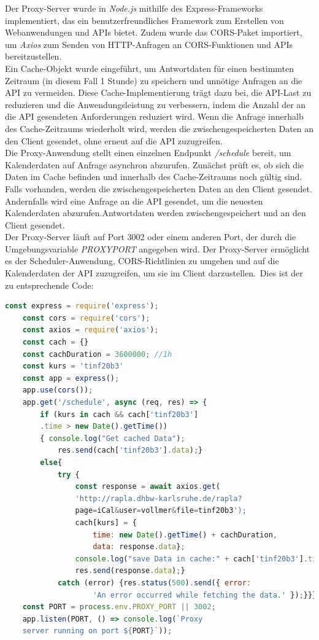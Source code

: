Der Proxy-Server wurde in \emph{Node.js} mithilfe des Express-Frameworks implementiert, das ein benutzerfreundliches Framework zum Erstellen von Webanwendungen und APIs bietet. Zudem wurde das CORS-Paket importiert, um \emph{Axios} zum Senden von HTTP-Anfragen an CORS-Funktionen und APIs bereitzustellen.\\
Ein Cache-Objekt wurde eingeführt, um  Antwortdaten für einen bestimmten Zeitraum (in diesem Fall 1 Stunde) zu speichern und unnötige Anfragen an die API zu vermeiden. Diese Cache-Implementierung trägt dazu bei, die API-Last zu reduzieren und die Anwendungsleistung zu verbessern, indem  die Anzahl der an die API gesendeten Anforderungen reduziert wird. Wenn die Anfrage innerhalb des Cache-Zeitraums wiederholt wird, werden die zwischengespeicherten Daten an den Client gesendet, ohne erneut auf die API zuzugreifen.\\
Die Proxy-Anwendung stellt einen einzelnen Endpunkt \emph{/schedule} bereit, um Kalenderdaten auf Anfrage asynchron abzurufen. Zunächst prüft es, ob sich die Daten im Cache befinden und innerhalb des Cache-Zeitraums noch  gültig sind. Falls vorhanden, werden die zwischengespeicherten Daten an den Client gesendet. Andernfalls wird eine Anfrage an die API gesendet, um die neuesten Kalenderdaten abzurufen.Antwortdaten werden zwischengespeichert und an den Client gesendet.\\
Der Proxy-Server läuft auf Port 3002 oder einem anderen Port, der durch die Umgebungsvariable \emph{PROXYPORT} angegeben wird. Der Proxy-Server ermöglicht es der Scheduler-Anwendung, CORS-Richtlinien zu umgehen und auf die Kalenderdaten der API zuzugreifen, um sie im Client darzustellen.\
Dies ist der zu entsprechende Code:
\begin{lstlisting}[language=JavaScript,
	frame=single,           % Ein Rahmen um den Code
	framexleftmargin=15pt,  % Rahmen link von den Zahlen
	style=algoBericht,
	label={Proxy-Server},
	captionpos=b ,          % Caption unter den Code setzen
	caption={Proxy-Server}]
	const express = require('express');
	const cors = require('cors');
	const axios = require('axios');
	const cach = {}
	const cachDuration = 3600000; //1h
	const kurs = 'tinf20b3'
	const app = express();
	app.use(cors());
	app.get('/schedule', async (req, res) => {
		if (kurs in cach && cach['tinf20b3']
		.time > new Date().getTime())
		{ console.log("Get cached Data");
			res.send(cach['tinf20b3'].data);}
		else{
			try {
				const response = await axios.get(
				'http://rapla.dhbw-karlsruhe.de/rapla?
				page=iCal&user=vollmer&file=tinf20b3');
				cach[kurs] = {
					time: new Date().getTime() + cachDuration,
					data: response.data};
				console.log("save Data in cache:" + cach['tinf20b3'].time);
				res.send(response.data);} 
			catch (error) {res.status(500).send({ error: 
					'An error occurred while fetching the data.' });}}});
	const PORT = process.env.PROXY_PORT || 3002;
	app.listen(PORT, () => console.log(`Proxy 
	server running on port ${PORT}`));
	
\end{lstlisting}
